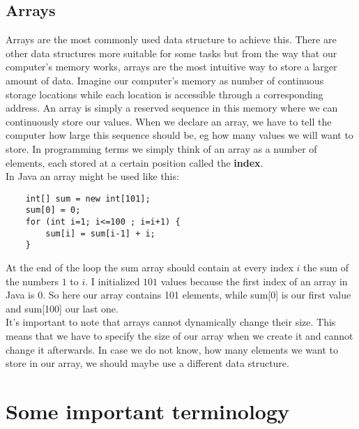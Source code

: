 \documentclass{scrreprt}
\begin{document}
\subsection{Arrays}
Arrays are the most commonly used data structure to achieve this. There are other data structures more suitable for some tasks but from the way that our computer's memory works, arrays are the most intuitive way to store a larger amount of data. Imagine our computer's memory as number of continuous storage locations while each location is accessible through a corresponding address. An array is simply a reserved sequence in this memory where we can continuously store our values. When we declare an array, we have to tell the computer how large this sequence should be, eg how many values we will want to store. In programming terms we simply think of an array as a number of elements, each stored at a certain position called the \textbf{index}. \\
In Java an array might be used like this:
\begin{lstlisting}
	int[] sum = new int[101];
	sum[0] = 0;
	for (int i=1; i<=100 ; i=i+1) {
		sum[i] = sum[i-1] + i;
	}
\end{lstlisting}
At the end of the loop the sum array should contain at every index $i$ the sum of the numbers $1$ to $i$. I initialized $101$ values because the first index of an array in Java is $0$. So here our array contains 101 elements, while sum[0] is our first value and sum[100] our last one. \\
It's important to note that arrays cannot dynamically change their size. This means that we have to specify the size of our array when we create it and cannot change it afterwards. In case we do not know, how many elements we want to store in our array, we should maybe use a different data structure.

\section{Some important terminology}
\end{document}
